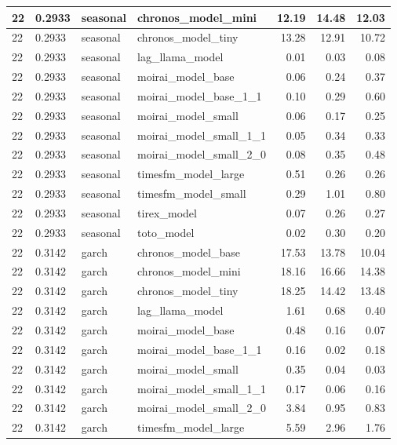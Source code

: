 {\begin{tabular}{llllrrr}
\midrule
22 & 0.2933 & seasonal & chronos\_model\_mini & 12.19 & 14.48 & 12.03 \\
\midrule
22 & 0.2933 & seasonal & chronos\_model\_tiny & 13.28 & 12.91 & 10.72 \\
\midrule
22 & 0.2933 & seasonal & lag\_llama\_model & 0.01 & 0.03 & 0.08 \\
\midrule
22 & 0.2933 & seasonal & moirai\_model\_base & 0.06 & 0.24 & 0.37 \\
\midrule
22 & 0.2933 & seasonal & moirai\_model\_base\_1\_1 & 0.10 & 0.29 & 0.60 \\
\midrule
22 & 0.2933 & seasonal & moirai\_model\_small & 0.06 & 0.17 & 0.25 \\
\midrule
22 & 0.2933 & seasonal & moirai\_model\_small\_1\_1 & 0.05 & 0.34 & 0.33 \\
\midrule
22 & 0.2933 & seasonal & moirai\_model\_small\_2\_0 & 0.08 & 0.35 & 0.48 \\
\midrule
22 & 0.2933 & seasonal & timesfm\_model\_large & 0.51 & 0.26 & 0.26 \\
\midrule
22 & 0.2933 & seasonal & timesfm\_model\_small & 0.29 & 1.01 & 0.80 \\
\midrule
22 & 0.2933 & seasonal & tirex\_model & 0.07 & 0.26 & 0.27 \\
\midrule
22 & 0.2933 & seasonal & toto\_model & 0.02 & 0.30 & 0.20 \\
\midrule
22 & 0.3142 & garch & chronos\_model\_base & 17.53 & 13.78 & 10.04 \\
\midrule
22 & 0.3142 & garch & chronos\_model\_mini & 18.16 & 16.66 & 14.38 \\
\midrule
22 & 0.3142 & garch & chronos\_model\_tiny & 18.25 & 14.42 & 13.48 \\
\midrule
22 & 0.3142 & garch & lag\_llama\_model & 1.61 & 0.68 & 0.40 \\
\midrule
22 & 0.3142 & garch & moirai\_model\_base & 0.48 & 0.16 & 0.07 \\
\midrule
22 & 0.3142 & garch & moirai\_model\_base\_1\_1 & 0.16 & 0.02 & 0.18 \\
\midrule
22 & 0.3142 & garch & moirai\_model\_small & 0.35 & 0.04 & 0.03 \\
\midrule
22 & 0.3142 & garch & moirai\_model\_small\_1\_1 & 0.17 & 0.06 & 0.16 \\
\midrule
22 & 0.3142 & garch & moirai\_model\_small\_2\_0 & 3.84 & 0.95 & 0.83 \\
\midrule
22 & 0.3142 & garch & timesfm\_model\_large & 5.59 & 2.96 & 1.76 \\

\end{tabular}}
